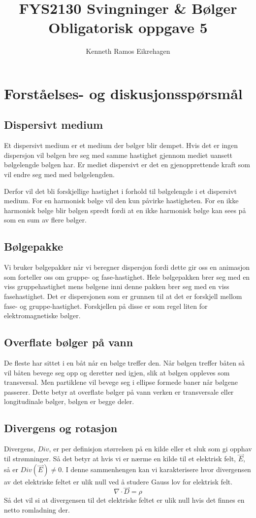 \documentclass[a4paper,12pt,norsk]{article}
\title{FYS2130 Svingninger \& Bølger \\Obligatorisk oppgave 5}
\author{Kenneth Ramos Eikrehagen}
\newcommand{\ov}{\overset}
\begin{document}
\maketitle
\newpage
\tableofcontents
\listoffigures
\newpage


\section{Forståelses- og diskusjonsspørsmål}

\subsection{Dispersivt medium}
Et dispersivt medium er et medium der bølger blir dempet. Hvis det er ingen dispersjon vil bølgen bre seg med samme hastighet gjennom mediet uansett bølgelengde bølgen har. Er mediet dispersivt er det en gjenopprettende kraft som vil endre seg med med bølgelengden.

Derfor vil det bli forskjellige hastighet i forhold til bølgelengde i et dispersivt medium. For en harmonisk bølge vil den kun påvirke hastigheten. For en ikke harmonisk bølge blir bølgen spredt fordi at en ikke harmonisk bølge kan sees på som en sum av flere bølger.

\subsection{Bølgepakke}
Vi bruker bølgepakker når vi beregner dispersjon fordi dette gir oss en animasjon som forteller oss om gruppe- og fase-hastighet. Hele bølgepakken brer seg med en viss gruppehastighet mens bølgene inni denne pakken brer seg med en viss fasehastighet. Det er dispersjonen som er grunnen til at det er forskjell mellom fase- og gruppe-hastighet. Forskjellen på disse er som regel liten for elektromagnetiske bølger. 

\subsection{Overflate bølger på vann}
De fleste har sittet i en båt når en bølge treffer den. Når bølgen treffer båten så vil båten bevege seg opp og deretter ned igjen, slik at bølgen oppleves som transversal. Men partiklene vil bevege seg i ellipse formede baner når bølgene passerer. Dette betyr at overflate bølger på vann verken er transversale eller longitudinale bølger, bølgen er begge deler. 

\subsection{Divergens og rotasjon}
Divergens, $Div$, er per definisjon størrelsen på en kilde eller et sluk som gi opphav til strømninger. Så det betyr at hvis vi er nærme en kilde til et elektrisk felt, $\ov{\rightharpoonup}{E}$, så er $Div(\ov{\rightharpoonup}{E}) \neq 0$. I denne sammenhengen kan vi karakterisere hvor divergensen av det elektriske feltet er ulik null ved å studere Gauss lov for elektrisk felt.
$$
\nabla \cdot \ov{\rightharpoonup}{D} = \rho
$$
Så det vil si at divergensen til det elektriske feltet er ulik null hvis det finnes en netto romladning der.
\end{document}
